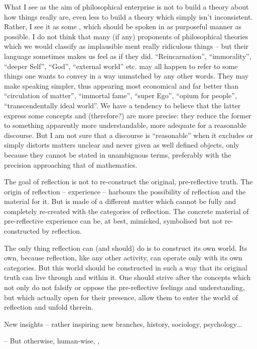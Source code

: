 {\pa
What I see as the aim of philosophical enterprise is not to build a theory about 
how things really are, even less to build a theory which simply isn't inconsistent. 
Rather, I see it as some ,  which
should be spoken in as purposeful manner as possible.
I do not think that many
(if any) proponents of philosophical theories which we would classify 
as implausible ment really ridiculous things -- but their language sometimes makes 
us feel as if they did. ``Reincarnation'', ``immorality'', ``deeper Self'', 
``God'', ``external world'' etc. may all happen to refer to some things 
one wants to convey in a way unmatched by any other words. They may make 
speaking simpler, thus appearing most economical and
far better than ``circulation of matter'', ``immortal fame'', ``super Ego'', 
``opium for people'', ``transcendentally ideal world''. 
We have a tendency to believe that the latter express some concepts and (therefore?)
are more precise:
they reduce the former to something apparently more understandable, more
adequate for a reasonable discourse. But I am not sure that a discourse is
``reasonable'' when it excludes or simply distorts matters unclear and
never given as well defined objects, only because they
cannot be stated in unambiguous terms, preferably with the precision 
approaching that of mathematics.

\pa
The goal of reflection is not to re-construct the original, pre-reflective
truth. The origin of reflection -- experience -- harbours the possibility of
reflection and the material for it. But is made of a different
matter which cannot be fully and completely re-created with the categories of
reflection. The concrete material of pre-reflective experience can be, at
best, mimicked, symbolised but not re-constructed by reflection.

The only thing reflection can (and should) do is to construct its own
world. Its own, because reflection, like any other activity, can operate only
with its own categories. But this world should be constructed in such a way
that its original truth can live through and within it. One should strive
after the concepts which not only do not falsify or oppose the pre-reflective
feelings and understanding, but which actually open for their presence, allow
them to enter the world of reflection and unfold therein.

New insights -- rather inspiring new branches, 
history, sociology, psychology...

-- But otherwise, human-wise, , 

}

